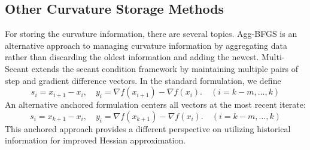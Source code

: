 \documentclass[0_en]{subfiles}
\begin{document}
\subsection{Other Curvature Storage Methods}

For storing the curvature information, there are several topics.
Agg-BFGS \citep{berahasLimitedmemoryBFGSDisplacement2022} is an alternative approach to managing curvature information by aggregating data rather than discarding the oldest information and adding the newest.
Multi-Secant \citep{leeAdvancingMultiSecantQuasiNewton2025} extends the secant condition framework by maintaining multiple pairs of step and gradient difference vectors. In the standard formulation, we define
\begin{equation*}
    s_i = x_{i+1} - x_i, \quad y_i = \nabla f(x_{i+1}) - \nabla f(x_i). \quad (i = k-m, \ldots, k)
\end{equation*}
An alternative anchored formulation centers all vectors at the most recent iterate:
\begin{equation*}
    s_i = x_{k+1} - x_i, \quad y_i = \nabla f(x_{k+1}) - \nabla f(x_i). \quad (i = k-m, \ldots, k)
\end{equation*}
This anchored approach provides a different perspective on utilizing historical information for improved Hessian approximation.

\ifSubfilesClassLoaded{
    
    
}{}
\end{document}
